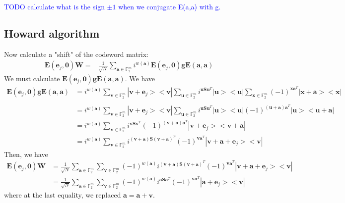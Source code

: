 \documentclass{article}
\begin{document}
	
	\textcolor{blue}{
		TODO calculate what is the sign $\pm 1$ when we conjugate E(a,a) with g.	
	}
	\\

	
	\subsection*{Howard algorithm}
	Now calculate a "shift" of the codeword matrix:
	\begin{align*}
		\mathbf{E}(\mathbf{e}_j, \mathbf{0})\mathbf{W} = &\frac{1}{\sqrt{N}} \sum_{\mathbf{a} \in \mathbb{F}^m_2} i^{w(\mathbf{a})}\mathbf{E}(\mathbf{e}_j,\mathbf{0})\mathbf{g}\mathbf{E}(\mathbf{a},\mathbf{a}) 
	\end{align*}
	We must calculate $\mathbf{E}(\mathbf{e}_j,\mathbf{0})\mathbf{g}\mathbf{E}(\mathbf{a},\mathbf{a})$. We have
	\begin{align*}
	\mathbf{E}(\mathbf{e}_j,\mathbf{0})\mathbf{g}\mathbf{E}(\mathbf{a},\mathbf{a})& = 	i^{w(\mathbf{a})}  \sum_{\mathbf{v} \in \mathbb{F}_2^m}{ |\mathbf{v}+\mathbf{e}_j><\mathbf{v}|}  \sum_{\mathbf{u} \in \mathbb{F}_2^m}{i^{\mathbf{u S}\mathbf{u}^T} |\mathbf{u}><\mathbf{u}|}\sum_{\mathbf{x} \in \mathbb{F}_2^m}{ (-1)^{\mathbf{x}\mathbf{a}^T}|\mathbf{x+a}><\mathbf{x}|} \\
	\\
	&= i^{w(\mathbf{a})}  \sum_{\mathbf{v} \in \mathbb{F}_2^m}{ |\mathbf{v}+\mathbf{e}_j><\mathbf{v}|}  \sum_{\mathbf{u} \in \mathbb{F}_2^m}{i^{\mathbf{u S}\mathbf{u}^T} |\mathbf{u}><\mathbf{u}|} (-1)^{(\mathbf{u+a})\mathbf{a}^T}|\mathbf{u}><\mathbf{u+a}| \\
	&= i^{w(\mathbf{a})} \sum_{\mathbf{v} \in \mathbb{F}_2^m}{i^{\mathbf{v}\mathbf{S}\mathbf{v}^T}(-1)^{(\mathbf{v+a})\mathbf{a}^T} |\mathbf{v}+\mathbf{e}_j><\mathbf{v+a}|} \\
	& = i^{w(\mathbf{a})} \sum_{\mathbf{v} \in \mathbb{F}_2^m}{i^{(\mathbf{v+a})\mathbf{S}(\mathbf{v+a})^T}(-1)^{\mathbf{v}\mathbf{a}^T} |\mathbf{v+a}+\mathbf{e}_j><\mathbf{v}|}
	\end{align*}
Then, we have
\begin{align*}
	\mathbf{E}(\mathbf{e}_j, \mathbf{0})\mathbf{W} &= \frac{1}{\sqrt{N}}  \sum_{\mathbf{a} \in \mathbb{F}_2^m}{\sum_{\mathbf{v} \in \mathbb{F}_2^m}{ (-1)^{w(\mathbf{a})} i^{(\mathbf{v+a})\mathbf{S}(\mathbf{v+a})^T}(-1)^{\mathbf{v}\mathbf{a}^T} |\mathbf{v+a}+\mathbf{e}_j><\mathbf{v}|}}\\
	& = \frac{1}{\sqrt{N}}  \sum_{\mathbf{a} \in \mathbb{F}_2^m}{\sum_{\mathbf{v} \in \mathbb{F}_2^m}{ (-1)^{w(\mathbf{a})} i^{\mathbf{a}\mathbf{S}\mathbf{a}^T}(-1)^{\mathbf{v}\mathbf{a}^T} |\mathbf{a}+\mathbf{e}_j><\mathbf{v}|}}
\end{align*}
where at the last equality, we replaced $\mathbf{a=a+v}$. 
	
\end{document}
